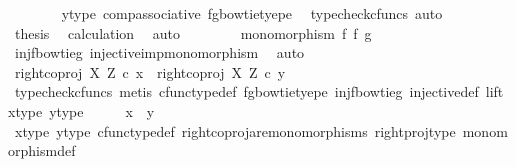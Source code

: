 \begin{isabellebody}
\ \ \ \ \ \ \isamarkupfalse%
\ y{\isacharunderscore}{\kern0pt}type{}\ comp{\isacharunderscore}{\kern0pt}associative{}\ fg{\isacharunderscore}{\kern0pt}bowtie{\isacharunderscore}{\kern0pt}tyepe\ \isamarkupfalse%
\ {\isacharparenleft}{\kern0pt}typecheck{\isacharunderscore}{\kern0pt}cfuncs{\isacharcomma}{\kern0pt}\ auto{\isacharparenright}{\kern0pt}\isanewline
\ \ \ \ \isamarkupfalse%
\ \isamarkupfalse%
\ {\isacharquery}{\kern0pt}thesis\ \isamarkupfalse%
\ calculation\ \isamarkupfalse%
\ auto\isanewline
\ \ \isamarkupfalse%
\isanewline
\ \ \isamarkupfalse%
\ \isamarkupfalse%
\ {\isachardoublequoteopen}monomorphism\ {\isacharparenleft}{\kern0pt}f\ {\isasymbowtie}\isactrlsub f\ g{\isacharparenright}{\kern0pt}{\isachardoublequoteclose}\isanewline
\ \ \ \ \isamarkupfalse%
\ inj{\isacharunderscore}{\kern0pt}f{\isacharunderscore}{\kern0pt}bowtie{\isacharunderscore}{\kern0pt}g\ injective{\isacharunderscore}{\kern0pt}imp{\isacharunderscore}{\kern0pt}monomorphism\ \isamarkupfalse%
\ auto\isanewline
\ \ \isamarkupfalse%
\ \isamarkupfalse%
\ {\isachardoublequoteopen}right{\isacharunderscore}{\kern0pt}coproj\ X\ Z\ {\isasymcirc}\isactrlsub c\ x\ {\isacharequal}{\kern0pt}\ right{\isacharunderscore}{\kern0pt}coproj\ X\ Z\ {\isasymcirc}\isactrlsub c\ y{\isachardoublequoteclose}\isanewline
\ \ \ \ \isamarkupfalse%
\ {\isacharparenleft}{\kern0pt}typecheck{\isacharunderscore}{\kern0pt}cfuncs{\isacharcomma}{\kern0pt}\ metis\ cfunc{\isacharunderscore}{\kern0pt}type{\isacharunderscore}{\kern0pt}def\ fg{\isacharunderscore}{\kern0pt}bowtie{\isacharunderscore}{\kern0pt}tyepe\ inj{\isacharunderscore}{\kern0pt}f{\isacharunderscore}{\kern0pt}bowtie{\isacharunderscore}{\kern0pt}g\ injective{\isacharunderscore}{\kern0pt}def\ lift\ x{\isacharunderscore}{\kern0pt}type{}\ y{\isacharunderscore}{\kern0pt}type{}{\isacharparenright}{\kern0pt}\isanewline
\ \ \isamarkupfalse%
\ \isamarkupfalse%
\ {\isachardoublequoteopen}x\ {\isacharequal}{\kern0pt}\ y{\isachardoublequoteclose}\isanewline
\ \ \ \ \isamarkupfalse%
\ x{\isacharunderscore}{\kern0pt}type{}\ y{\isacharunderscore}{\kern0pt}type{}\ cfunc{\isacharunderscore}{\kern0pt}type{\isacharunderscore}{\kern0pt}def\ right{\isacharunderscore}{\kern0pt}coproj{\isacharunderscore}{\kern0pt}are{\isacharunderscore}{\kern0pt}monomorphisms\ right{\isacharunderscore}{\kern0pt}proj{\isacharunderscore}{\kern0pt}type\ monomorphism{\isacharunderscore}{\kern0pt}def\ \isamarkupfalse%

\end{isabellebody}
